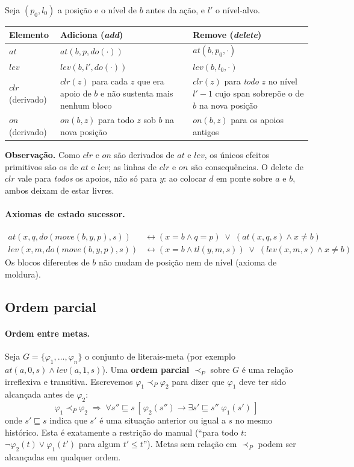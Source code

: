\documentclass[11pt,a4paper]{article}
\newcommand{\At}{\mathit{at}}
\newcommand{\Lev}{\mathit{lev}}
\newcommand{\Clr}{\mathit{clr}}
\newcommand{\On}{\mathit{on}}
\newcommand{\Tl}{\mathit{tl}}
\newcommand{\Move}{\mathit{move}}
\newcommand{\Do}{\mathit{do}}
\begin{document}
Seja $(p_0,l_0)$ a posição e o nível de $b$ antes da ação, e $l'$ o nível-alvo.

\begin{center}
\begin{tabular}{@{}p{2.4cm}p{5.2cm}p{5.6cm}@{}}
\toprule
Elemento & Adiciona (\emph{add}) & Remove (\emph{delete}) \\
\midrule
$\At$ & $\At(b,p,\Do(\cdot))$ & $\At(b,p_0,\cdot)$ \\
$\Lev$ & $\Lev(b,l',\Do(\cdot))$ & $\Lev(b,l_0,\cdot)$ \\
$\Clr$ (derivado) & $\Clr(z)$ para cada $z$ que era apoio de $b$ e não sustenta mais nenhum bloco & $\Clr(z)$ para \emph{todo} $z$ no nível $l'-1$ cujo span sobrepõe o de $b$ na nova posição \\
$\On$ (derivado) & $\On(b,z)$ para todo $z$ sob $b$ na nova posição & $\On(b,z)$ para os apoios antigos \\
\bottomrule
\end{tabular}
\end{center}

\noindent\textbf{Observação.} Como $\Clr$ e $\On$ são derivados de $\At$ e $\Lev$, os únicos efeitos primitivos são os de $\At$ e $\Lev$; as linhas de $\Clr$ e $\On$ são consequências. O delete de $\Clr$ vale para \emph{todos} os apoios, não só para $y$: ao colocar $d$ em ponte sobre $a$ e $b$, ambos deixam de estar livres.

\paragraph{Axiomas de estado sucessor.}
\begin{align*}
\At(x,q,\Do(\Move(b,y,p),s))&\leftrightarrow (x=b\wedge q=p)\;\vee\;(\At(x,q,s)\wedge x\ne b)\\
\Lev(x,m,\Do(\Move(b,y,p),s))&\leftrightarrow (x=b\wedge\Tl(y,m,s))\;\vee\;(\Lev(x,m,s)\wedge x\ne b)
\end{align*}
Os blocos diferentes de $b$ não mudam de posição nem de nível (axioma de moldura).

\subsection{Ordem parcial}

\paragraph{Ordem entre metas.}
Seja $G=\{\varphi_1,\dots,\varphi_n\}$ o conjunto de literais-meta (por exemplo $\At(a,0,s)\wedge\Lev(a,1,s)$). Uma \textbf{ordem parcial} $\prec_P$ sobre $G$ é uma relação irreflexiva e transitiva. Escrevemos $\varphi_1\prec_P\varphi_2$ para dizer que $\varphi_1$ deve ter sido alcançada antes de $\varphi_2$:
\[
\varphi_1\prec_P\varphi_2\;\Rightarrow\;\forall s''\sqsubseteq s\,[\,\varphi_2(s'')\rightarrow\exists s'\sqsubseteq s''\;\varphi_1(s')\,]
\]
onde $s'\sqsubseteq s$ indica que $s'$ é uma situação anterior ou igual a $s$ no mesmo histórico. Esta é exatamente a restrição do manual (``para todo $t$: $\neg\varphi_2(t)\vee\varphi_1(t')$ para algum $t'\le t$''). Metas sem relação em $\prec_P$ podem ser alcançadas em qualquer ordem.
\end{document}
